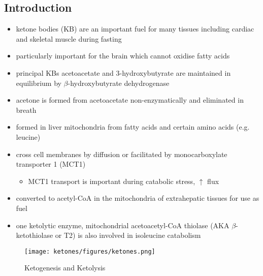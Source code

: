 \documentclass[12pt]{scrartcl}
\begin{document}
\subsection{Introduction}
\label{sec:orgfc9932c}
\begin{itemize}
\item ketone bodies (KB) are an important fuel for many tissues including
cardiac and skeletal muscle during fasting
\item particularly important for the brain which cannot oxidise fatty
acids
\item principal KBs acetoacetate and 3-hydroxybutyrate are maintained in
equilibrium by \(\beta\)-hydroxybutyrate dehydrogenase

\end{itemize}

\begin{center}
\setatomsep{1.8em}
\hspace{20}
\hspace{20}
\end{center}

\begin{itemize}
\item acetone is formed from acetoacetate non-enzymatically and eliminated in breath
\item formed in liver mitochondria from fatty acids and certain amino acids (e.g. leucine)
\item cross cell membranes by diffusion or facilitated by monocarboxylate transporter 1 (MCT1)
\begin{itemize}
\item MCT1 transport is important during catabolic stress, \(\uparrow\) flux
\end{itemize}
\item converted to acetyl-CoA in the mitochondria of extrahepatic tissues for use as fuel
\item one ketolytic enzyme, mitochondrial acetoacetyl-CoA thiolase (AKA
\(\beta\)-ketothiolase or T2) is also involved in isoleucine catabolism
\end{itemize}

\begin{figure}[htbp]
\centering
\texttt{[image: ketones/figures/ketones.png]}
\caption{\label{fig:org4e22208}Ketogenesis and Ketolysis}
\end{figure}
\end{document}
